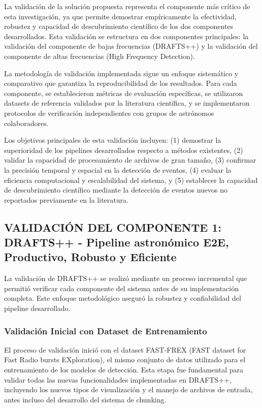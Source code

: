 
La validación de la solución propuesta representa el componente más crítico de esta investigación, ya que permite demostrar empíricamente la efectividad, robustez y capacidad de descubrimiento científico de los dos componentes desarrollados. Esta validación se estructura en dos componentes principales: la validación del componente de bajas frecuencias (DRAFTS++) y la validación del componente de altas frecuencias (High Frequency Detection).

La metodología de validación implementada sigue un enfoque sistemático y comparativo que garantiza la reproducibilidad de los resultados. Para cada componente, se establecieron métricas de evaluación específicas, se utilizaron datasets de referencia validados por la literatura científica, y se implementaron protocolos de verificación independientes con grupos de astrónomos colaboradores.

Los objetivos principales de esta validación incluyen: (1) demostrar la superioridad de los pipelines desarrollados respecto a métodos existentes, (2) validar la capacidad de procesamiento de archivos de gran tamaño, (3) confirmar la precisión temporal y espacial en la detección de eventos, (4) evaluar la eficiencia computacional y escalabilidad del sistema, y (5) establecer la capacidad de descubrimiento científico mediante la detección de eventos nuevos no reportados previamente en la literatura.

\subsection{VALIDACIÓN DEL COMPONENTE 1: DRAFTS++ - Pipeline astronómico E2E, Productivo, Robusto y Eficiente}

La validación de DRAFTS++ se realizó mediante un proceso incremental que permitió verificar cada componente del sistema antes de su implementación completa. Este enfoque metodológico aseguró la robustez y confiabilidad del pipeline desarrollado.

\subsubsection{Validación Inicial con Dataset de Entrenamiento}

El proceso de validación inició con el dataset FAST-FREX (FAST dataset for Fast Radio bursts EXploration), el mismo conjunto de datos utilizado para el entrenamiento de los modelos de detección. Esta etapa fue fundamental para validar todas las nuevas funcionalidades implementadas en DRAFTS++, incluyendo los nuevos tipos de visualización y el manejo de archivos de entrada, antes incluso del desarrollo del sistema de chunking.


